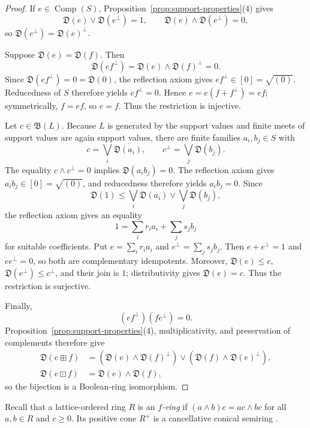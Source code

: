 \documentclass[12pt,leqno]{amsart}
\theoremstyle{definition}
\numberwithin{equation}{section}
\theoremstyle{remark}
\def\leq{\leqslant}
\begin{document}
\begin{proof}
If \(e\in\operatorname{Comp}(S)\), Proposition~\ref{prop:support-properties}(4) gives
\[
\mathfrak D(e)\vee\mathfrak D(e^\perp)=1,
\qquad
\mathfrak D(e)\wedge\mathfrak D(e^\perp)=0,
\]
so \(\mathfrak D(e^\perp)=\mathfrak D(e)^\bot\).

Suppose \(\mathfrak D(e)=\mathfrak D(f)\). Then
\[
\mathfrak D(ef^\perp)
 =\mathfrak D(e)\wedge\mathfrak D(f)^\bot=0.
\]
Since \(\mathfrak D(ef^\perp)=0=\mathfrak D(0)\), the reflection axiom gives
\(ef^\perp\in[0]=\sqrt{(0)}\). Reducedness of $S$ therefore yields
\(ef^\perp=0\). Hence
\(e=e(f+f^\perp)=ef\); symmetrically, \(f=ef\), so \(e=f\). Thus the restriction is injective.

Let \(c\in\mathfrak B(L)\). Because $L$ is generated by the support values and finite meets of support values are again support values, there are finite families \(a_i,b_j\in S\) with
\[
c=\bigvee_i\mathfrak D(a_i),
\qquad
c^\bot=\bigvee_j\mathfrak D(b_j).
\]
The equality \(c\wedge c^\bot=0\) implies \(\mathfrak D(a_i b_j)=0\). The reflection axiom gives \(a_i b_j\in[0]=\sqrt{(0)}\), and reducedness therefore yields \(a_i b_j=0\). Since
\[
\mathfrak D(1)\leq
\bigvee_i\mathfrak D(a_i)\vee\bigvee_j\mathfrak D(b_j),
\]
the reflection axiom gives an equality
\[
1=\sum_i r_i a_i+\sum_j s_j b_j
\]
for suitable coefficients. Put \(e=\sum_i r_i a_i\) and \(e^\perp=\sum_j s_j b_j\). Then \(e+e^\perp=1\) and \(ee^\perp=0\), so both are complementary idempotents. Moreover,
\(\mathfrak D(e)\leq c\), \(\mathfrak D(e^\perp)\leq c^\bot\), and their join is $1$; distributivity gives \(\mathfrak D(e)=c\). Thus the restriction is surjective.

Finally,
\[
(ef^\perp)(fe^\perp)=0.
\]
Proposition~\ref{prop:support-properties}(4), multiplicativity, and preservation of complements therefore give
\begin{align*}
\mathfrak D(e\boxplus f)
 &=(\mathfrak D(e)\wedge\mathfrak D(f)^\bot)
  \vee(\mathfrak D(f)\wedge\mathfrak D(e)^\bot),\\
\mathfrak D(e\boxdot f)
 &=\mathfrak D(e)\wedge\mathfrak D(f),
\end{align*}
so the bijection is a Boolean-ring isomorphism.
\end{proof}

Recall that a lattice-ordered ring $R$ is an \emph{$f$-ring} if
\((a\wedge b)c=ac\wedge bc\) for all \(a,b\in R\) and \(c\geq0\). Its positive cone \(R^+\) is a cancellative conical semiring \cite{Fuchs}.
\end{document}
